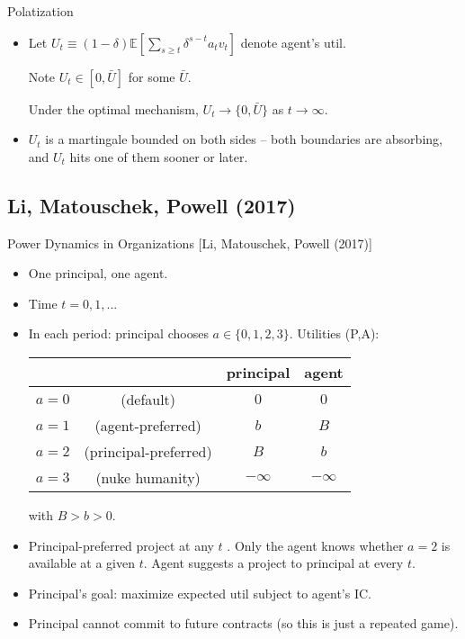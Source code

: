 \documentclass[english,10pt
,aspectratio=169
]{beamer}
\begin{document}
\begin{frame}{Polatization}
\begin{itemize}
	\item Let $U_t \equiv (1-\delta) \mathbb{E} \left[\sum_{s \geq t} \delta^{s-t} a_t v_t\right]$ denote agent's util. 
	
	Note $U_t \in \left[0,\bar{U}\right]$ for some $\bar{U}$.
	
	\begin{theorem}[Polarisation]
		Under the optimal mechanism, $U_t \to \{0, \bar{U}\}$ as $t \to \infty$.
	\end{theorem}
	
	\item $U_t$ is a martingale bounded on both sides -- both boundaries are absorbing, and $U_t$ hits one of them sooner or later.
\end{itemize}
\end{frame}


\subsection{Li, Matouschek, Powell (2017)}

\begin{frame}{Power Dynamics in Organizations [Li, Matouschek, Powell (2017)]}
\begin{itemize}
	\item One principal, one agent.
	\item Time $t=0,1,...$
	\item In each period: principal chooses $a \in \{0,1,2,3\}$. Utilities (P,A):
	\medskip
	\begin{center}
		\begin{tabular}{c c | c | c |}
			& & principal 	& agent \\ \hline
			$a=0$ & (default)	& $0$ 	& $0$	\\ \hline
			$a=1$ & (agent-preferred)	& $b$ 	& $B$	\\ \hline
			$a=2$ & (principal-preferred)	& $B$ 	& $b$	\\ \hline
			$a=3$ & (nuke humanity)	& $-\infty$	& $-\infty$ \\ \hline
		\end{tabular}
	\end{center}
	\medskip
	with $B > b > 0$.
	\item Principal-preferred project  at any $t$ . Only the agent knows whether $a=2$ is available at a given $t$. Agent suggests a project to principal at every $t$.
	\item Principal's goal: maximize expected util subject to agent's IC.
	\item Principal \alert{cannot commit} to future contracts (so this is just a repeated game).
\end{itemize}
\end{frame}
\end{document}
